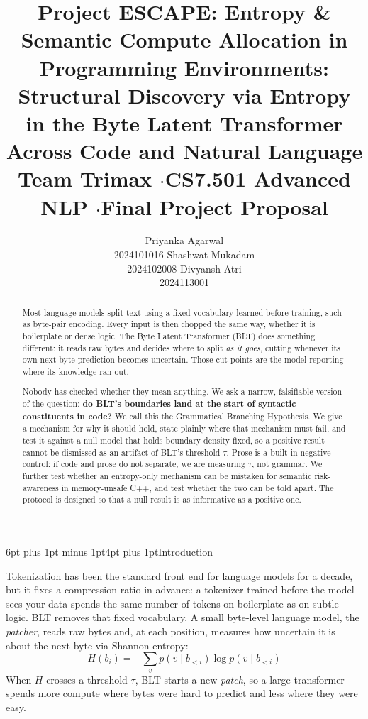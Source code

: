 \documentclass[9pt]{extarticle}
\title{\textbf{Project ESCAPE}: Entropy \& Semantic Compute Allocation in
Programming Environments: Structural Discovery via Entropy in the Byte Latent
Transformer Across Code and Natural Language \\[6pt]
{\normalsize\normalfont Team Trimax \quad$\cdot$\quad CS7.501 Advanced NLP \quad$\cdot$\quad Final Project Proposal}}
\author{
  Priyanka Agarwal\\ 2024101016
  \And Shashwat Mukadam\\ 2024102008
  \And Divyansh Atri\\ 2024113001
}
\makeatletter
\renewcommand\section{\@startsection{section}{1}{0pt}%
  {6pt plus 1pt minus 1pt}{4pt plus 1pt}{\normalfont\large\bfseries}}
\makeatother
\begin{document}
\maketitle

\begin{abstract}
\noindent
Most language models split text using a fixed vocabulary learned before training,
such as byte-pair encoding. Every input is then chopped the same way, whether it
is boilerplate or dense logic. The Byte Latent Transformer (BLT)
\citep{pagnoni2024blt} does something different: it reads raw bytes and decides
where to split \emph{as it goes}, cutting whenever its own next-byte prediction
becomes uncertain. Those cut points are the model reporting where its knowledge
ran out.

Nobody has checked whether they mean anything. We ask a narrow, falsifiable
version of the question: \textbf{do BLT's boundaries land at the start of
syntactic constituents in code?} We call this the Grammatical Branching
Hypothesis. We give a mechanism for why it should hold, state plainly where that
mechanism must fail, and test it against a null model that holds boundary density
fixed, so a positive result cannot be dismissed as an artifact of BLT's
threshold $\tau$. Prose is a built-in negative control: if code and prose do not
separate, we are measuring $\tau$, not grammar. We further test whether an
entropy-only mechanism can be mistaken for semantic risk-awareness in
memory-unsafe C++, and test whether the two can be told apart. The protocol is
designed so that a null result is as informative as a positive one.
\end{abstract}

\section{Introduction}

Tokenization has been the standard front end for language models for a decade,
but it fixes a compression ratio in advance: a tokenizer trained before the
model sees your data spends the same number of tokens on boilerplate as on
subtle logic. BLT removes that fixed vocabulary. A small byte-level language
model, the \emph{patcher}, reads raw bytes and, at each position,
measures how uncertain it is about the next byte via Shannon entropy:
\begin{equation}
H(b_i) = -\sum_v p(v \mid b_{<i}) \log p(v \mid b_{<i})
\label{eq:entropy}
\end{equation}
When $H$ crosses a threshold $\tau$, BLT starts a new \emph{patch}, so a large
transformer spends more compute where bytes were hard to predict and less where
they were easy.
\end{document}

